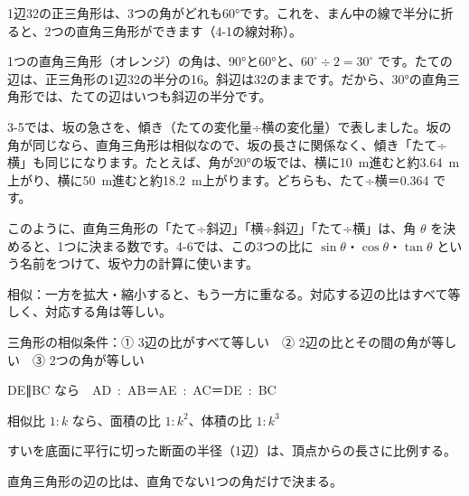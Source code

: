 \noindent\begin{minipage}[c]{0.36\linewidth}\centering
{}
\end{minipage}\hfill
\begin{minipage}[c]{0.6\linewidth}
1辺32の正三角形は、3つの角がどれも60°です。これを、まん中の線で半分に折ると、2つの直角三角形ができます（4-1の線対称）。

1つの直角三角形（オレンジ）の角は、90°と60°と、$60^{\circ}\div2=30^{\circ}$ です。たての辺は、正三角形の1辺32の半分の16。斜辺は32のままです。だから、30°の直角三角形では、たての辺はいつも斜辺の半分です。
\end{minipage}

3-5では、坂の急さを、傾き（たての変化量÷横の変化量）で表しました。坂の角が同じなら、直角三角形は相似なので、坂の長さに関係なく、傾き「たて÷横」も同じになります。たとえば、角が20°の坂では、横に\qty{10}{m}進むと約\qty{3.64}{m}上がり、横に\qty{50}{m}進むと約\qty{18.2}{m}上がります。どちらも、たて÷横＝0.364 です。

このように、直角三角形の「たて÷斜辺」「横÷斜辺」「たて÷横」は、角 $\theta$ を決めると、1つに決まる数です。4-6では、この3つの比に $\sin\theta$・$\cos\theta$・$\tan\theta$ という名前をつけて、坂や力の計算に使います。

\begin{taisetsu}
相似：一方を拡大・縮小すると、もう一方に重なる。対応する辺の比はすべて等しく、対応する角は等しい。\par\vspace{2pt}
三角形の相似条件：① 3辺の比がすべて等しい　② 2辺の比とその間の角が等しい　③ 2つの角が等しい\par\vspace{2pt}
DE∥BC なら　\mbox{AD : AB＝AE : AC＝DE : BC}\par\vspace{2pt}
相似比 $1:k$ なら、面積の比 $1:k^2$、体積の比 $1:k^3$\par\vspace{2pt}
すいを底面に平行に切った断面の半径（1辺）は、頂点からの長さに比例する。\par\vspace{2pt}
直角三角形の辺の比は、直角でない1つの角だけで決まる。
\end{taisetsu}

